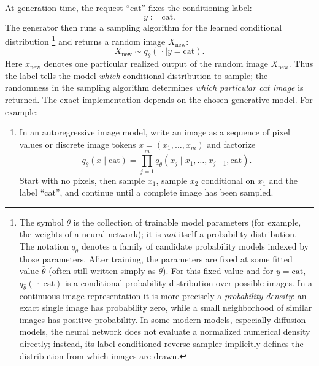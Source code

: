 \documentclass[11pt,a4paper]{article}
\theoremstyle{definition}
\begin{document}
\begin{example}
\begin{center}
\end{center}

At generation time, the request ``cat'' fixes the conditioning label:
\[
y:=\text{cat}.
\]
The generator then runs a sampling algorithm for the learned conditional distribution%
\footnote{The symbol $\theta$ is the collection of trainable model parameters (for example,
the weights of a neural network); it is \emph{not} itself a probability distribution.
The notation $q_\theta$ denotes a family of candidate probability models indexed by those
parameters. After training, the parameters are fixed at some fitted value $\widehat{\theta}$
(often still written simply as $\theta$). For this fixed value and for $y=\text{cat}$,
$q_{\widehat{\theta}}(\,\cdot\mid\text{cat})$ is a conditional probability distribution
over possible images. In a continuous image representation it is more precisely a
\emph{probability density}: an exact single image has probability zero, while a small
neighborhood of similar images has positive probability. In some modern models, especially
diffusion models, the neural network does not evaluate a normalized numerical density
directly; instead, its label-conditioned reverse sampler implicitly defines the distribution
from which images are drawn.} and returns a random image $X_{\mathrm{new}}$:
\[
X_{\mathrm{new}}\sim q_\theta(\,\cdot\mid y=\text{cat}).
\]
Here $x_{\mathrm{new}}$ denotes one particular realized output of the random image
$X_{\mathrm{new}}$. Thus the label tells the model \emph{which} conditional distribution to
sample; the randomness in the sampling algorithm determines \emph{which particular cat
image} is returned. The exact implementation depends on the chosen generative model. For
example:
\begin{enumerate}[label=(\roman*)]
    \item In an autoregressive image model, write an image as a sequence of pixel values or
    discrete image tokens $x=(x_1,\ldots,x_m)$ and factorize
    \[
    q_\theta(x\mid\text{cat})
    =\prod_{j=1}^{m}q_\theta(x_j\mid x_1,\ldots,x_{j-1},\text{cat}).
    \]
    Start with no pixels, then sample $x_1$, sample $x_2$ conditional on $x_1$ and the label
    ``cat'', and continue until a complete image has been sampled.


\end{enumerate}
\end{example}
\end{document}
